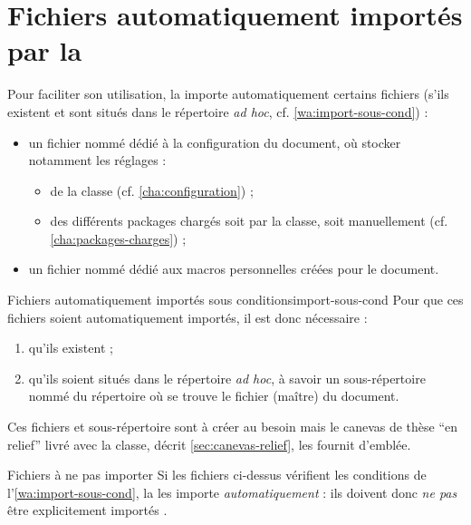 \chapter{Fichiers automatiquement importés par la \yatcl{}}
\label{cha:fichiers-importes-par}

Pour faciliter son utilisation, la \yatcl{} importe automatiquement certains
fichiers (s'ils existent et sont situés dans le répertoire \emph{ad hoc},
cf. \vref{wa:import-sous-cond}) :
\begin{itemize}
\item un fichier nommé \file{\configurationfile} dédié à la configuration du
  document, où stocker notamment les réglages :
  \begin{itemize}
  \item de la classe \yatcl (cf. \vref{cha:configuration}) ;
  \item des différents packages chargés soit par la classe, soit manuellement
    (cf. \vref{cha:packages-charges}) ;
  \end{itemize}
\item un fichier nommé \file{\macrosfile} dédié aux macros personnelles créées
  pour le document.
\end{itemize}
\begin{dbwarning}{Fichiers automatiquement importés sous conditions}{import-sous-cond}
  Pour que ces fichiers soient automatiquement importés, il est donc
  nécessaire :
  \begin{enumerate}
  \item qu'ils existent ;
  \item qu'ils soient situés dans le répertoire \emph{ad hoc}, à savoir un
    sous-répertoire nommé \directory{\configurationdirectory} du répertoire où
    se trouve le fichier (maître) du document.
  \end{enumerate}
\end{dbwarning}
Ces fichiers et sous-répertoire sont à créer au besoin mais le canevas de thèse
\enquote{en relief} livré avec la classe, décrit \vref{sec:canevas-relief}, les
fournit d'emblée.
\begin{dbwarning}{Fichiers à ne pas importer}{}
  Si les fichiers ci-dessus vérifient les conditions de
  l'\vref{wa:import-sous-cond}, la \yatcl{} les importe
  \emph{automatiquement} : ils doivent donc \emph{ne pas} être explicitement
  importés .
\end{dbwarning}
